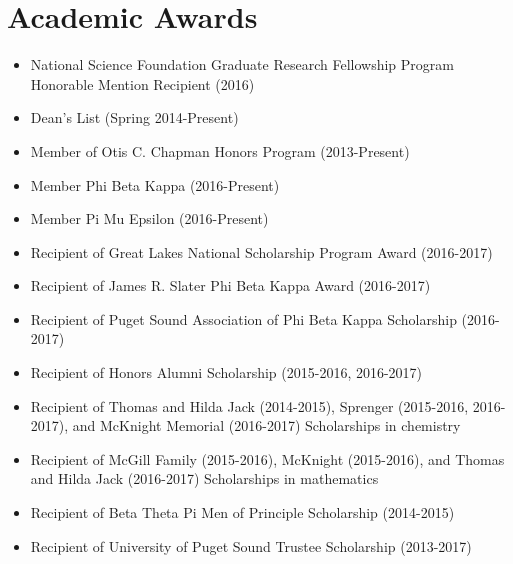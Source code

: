 \section{Academic Awards} 
 \begin{itemize}
 \item National Science Foundation Graduate Research Fellowship Program Honorable Mention Recipient (2016)
 \item Dean's List (Spring 2014-Present)
 \item Member of Otis C. Chapman Honors Program (2013-Present)
 \item Member Phi Beta Kappa (2016-Present)
 \item Member Pi Mu Epsilon (2016-Present)
 \item Recipient of Great Lakes National Scholarship Program Award (2016-2017)
 \item Recipient of James R. Slater Phi Beta Kappa Award (2016-2017)
 \item Recipient of Puget Sound Association of Phi Beta Kappa Scholarship (2016-2017)
 \item Recipient of Honors Alumni Scholarship (2015-2016, 2016-2017)
 \item Recipient of Thomas and Hilda Jack (2014-2015), Sprenger (2015-2016, 2016-2017), and McKnight Memorial (2016-2017) Scholarships in chemistry 
 \item Recipient of McGill Family (2015-2016), McKnight (2015-2016), and Thomas and Hilda Jack (2016-2017) Scholarships in mathematics 
 \item Recipient of Beta Theta Pi Men of Principle Scholarship (2014-2015)
 \item Recipient of University of Puget Sound Trustee Scholarship (2013-2017)
 \end{itemize}
\vspace{-3.5mm}